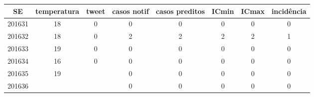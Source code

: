 \begin{tabular}{c|ccccccc}
  \hline
SE & temperatura & tweet & casos notif & casos preditos & ICmin & ICmax & incidência \\ 
  \hline
201631 & 18 & 0 & 0 & 0 & 0 & 0 & 0 \\ 
  201632 & 18 & 0 & 2 & 2 & 2 & 2 & 1 \\ 
  201633 & 19 & 0 & 0 & 0 & 0 & 0 & 0 \\ 
  201634 & 16 & 0 & 0 & 0 & 0 & 0 & 0 \\ 
  201635 & 19 &  & 0 & 0 & 0 & 0 & 0 \\ 
  201636 &  &  & 0 & 0 & 0 & 0 & 0 \\ 
   \hline
\end{tabular}
